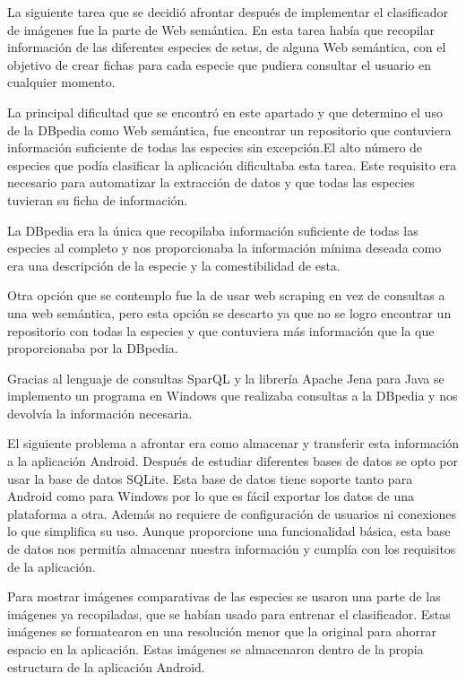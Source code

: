 La siguiente tarea que se decidió afrontar después de implementar el clasificador de imágenes fue la parte de Web semántica. En esta tarea había que recopilar información de las diferentes especies de setas, de alguna Web semántica, con el objetivo de crear fichas para cada especie que pudiera consultar el usuario en cualquier momento.

La principal dificultad que se encontró en este apartado y que determino el uso de la DBpedia como Web semántica, fue encontrar un repositorio que contuviera información suficiente de todas las especies sin excepción.El alto número de especies que podía clasificar la aplicación dificultaba esta tarea. Este requisito era necesario para automatizar la extracción de datos y que todas las especies tuvieran su ficha de información.

La DBpedia era la única que recopilaba información suficiente de todas las especies al completo y nos proporcionaba la información mínima deseada como era una descripción de la especie y la comestibilidad de esta.

Otra opción que se contemplo fue la de usar web scraping en vez de consultas a una web semántica, pero esta opción se descarto ya que no se logro encontrar un repositorio con todas la especies y que contuviera más información que la que proporcionaba por la DBpedia.

Gracias al lenguaje de consultas SparQL y la librería Apache Jena para Java se implemento un programa en Windows que realizaba consultas a la DBpedia y nos devolvía la información necesaria.

El siguiente problema a afrontar era como almacenar y transferir esta información a la aplicación Android. Después de estudiar diferentes bases de datos se opto por usar la base de datos SQLite. Esta base de datos tiene soporte tanto para Android como para Windows por lo que es fácil exportar los datos de una plataforma a otra. Además no requiere de configuración de usuarios ni conexiones lo que simplifica su uso. Aunque proporcione una funcionalidad básica, esta base de datos nos permitía almacenar nuestra información y cumplía con los requisitos de la aplicación.

Para mostrar imágenes comparativas de las especies se usaron una parte de las imágenes ya recopiladas, que se habían usado para entrenar el clasificador. Estas imágenes se formatearon en una resolución menor que la original para ahorrar espacio en la aplicación. Estas imágenes se almacenaron dentro de la propia estructura de la aplicación Android.

